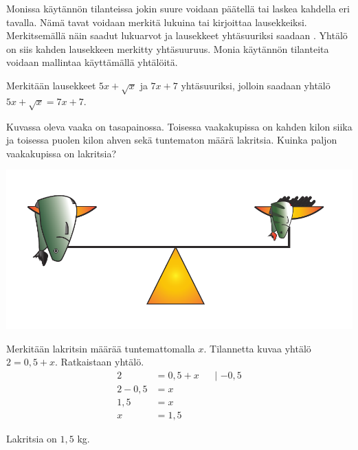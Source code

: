 Monissa käytännön tilanteissa jokin suure voidaan päätellä tai laskea kahdella eri tavalla. Nämä tavat voidaan merkitä lukuina tai kirjoittaa lausekkeiksi. Merkitsemällä näin saadut lukuarvot ja lausekkeet yhtäsuuriksi saadaan . Yhtälö on siis kahden lausekkeen merkitty yhtäsuuruus. Monia käytännön tilanteita voidaan mallintaa käyttämällä yhtälöitä.

\begin{esimerkki}
	Merkitään lausekkeet $5x+\sqrt{x}$ ja $7x+7$ yhtäsuuriksi, jolloin saadaan yhtälö $5x+\sqrt{x} = 7x+7$.
\end{esimerkki}


\begin{esimerkki}
	\begin{alakohdat}
	\end{alakohdat}
\end{esimerkki}

\begin{esimerkki}
	Kuvassa oleva vaaka on tasapainossa. Toisessa vaakakupissa on kahden kilon siika ja toisessa puolen kilon ahven sekä tuntematon määrä lakritsia.
	Kuinka paljon vaakakupissa on lakritsia?
	\begin{center}
		\includegraphics[scale=0.6]{pictures/Kuva10-1-vaaka.pdf} %
	\end{center}
	\begin{esimratk}
		Merkitään lakritsin määrää tuntemattomalla $x$. Tilannetta kuvaa yhtälö $2 = 0,5 + x$.
		Ratkaistaan yhtälö.
		\begin{align*}
			2 &= 0,5 + x &&\text{| $-0,5$} \\
			2 - 0,5 &= x && \\
			1,5 &= x && \\
			x &= 1{,5} &&
		\end{align*}
	\end{esimratk}
	\begin{esimvast}
		Lakritsia on $1,5$ kg.
	\end{esimvast}
\end{esimerkki}

